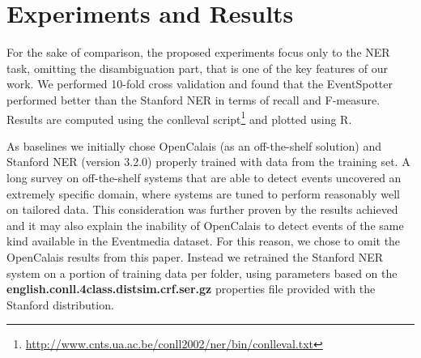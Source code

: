 \documentclass[10pt,a4paper]{article}
\begin{document}
\section{Experiments and Results}
For the sake of comparison, the proposed experiments focus only to the NER task, omitting the disambiguation part, that is one of the key features of our work. We performed 10-fold cross validation and found that the EventSpotter performed better than the Stanford NER in terms of recall and F-measure. Results are computed using the conlleval script\footnote{\url{http://www.cnts.ua.ac.be/conll2002/ner/bin/conlleval.txt}} and plotted using R.

As baselines we initially chose OpenCalais (as an off-the-shelf solution) and Stanford NER (version 3.2.0) properly trained with data from the training set. 
A long survey on off-the-shelf systems that are able to detect events uncovered an extremely specific domain, where systems are tuned to perform reasonably well on tailored data. This consideration was further proven by the results achieved and it may also explain the inability of OpenCalais to detect events of the same kind available in the Eventmedia dataset. For this reason, we chose to omit the OpenCalais results from this paper.
Instead we retrained the Stanford NER system on a portion of training data per folder, using parameters based on the \textbf{english.conll.4class.distsim.crf.ser.gz} properties file provided with the Stanford distribution.
\end{document}
